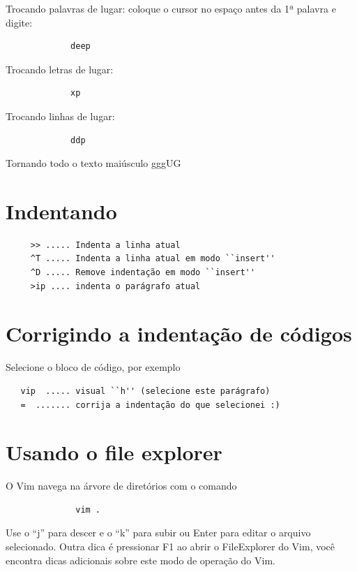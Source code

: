 \documentclass[10pt,a4paper,openany]{book}
\begin{document}
Trocando palavras de lugar: coloque o cursor no espaço antes da 1ª palavra e digite:

\begin{verbatim}
			 deep
\end{verbatim}

Trocando letras de lugar:

\begin{verbatim}
			 xp
\end{verbatim}

Trocando linhas de lugar:

\begin{verbatim}
			 ddp
\end{verbatim}

Tornando todo o texto maiúsculo
 gggUG

\section{Indentando }

\begin{verbatim}
	 >> ..... Indenta a linha atual
	 ^T ..... Indenta a linha atual em modo ``insert''
	 ^D ..... Remove indentação em modo ``insert''
	 >ip .... indenta o parágrafo atual
\end{verbatim}

\section{Corrigindo a indentação de códigos}
\label{Corrigindo a indentação de códigos}
Selecione o bloco de código, por exemplo

\begin{verbatim}
   vip  ..... visual ``h'' (selecione este parágrafo)
   =  ....... corrija a indentação do que selecionei :)
\end{verbatim}

\section{Usando o file explorer}
\label{Usando o file explorer}
O Vim navega na árvore de diretórios com o comando

\begin{verbatim}
			  vim .
\end{verbatim}

Use o ``j'' para descer e o ``k'' para subir ou Enter para editar o
arquivo selecionado. Outra dica é pressionar F1 ao abrir o
FileExplorer do Vim, você encontra dicas adicionais sobre este modo de
operação do Vim.
\end{document}
